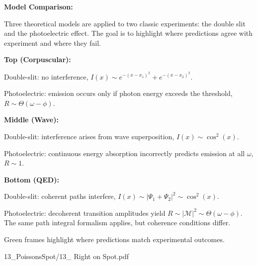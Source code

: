 \begin{SideNotePage}{
  \textbf{Model Comparison:} \par Three theoretical models are applied to two classic experiments: the double slit and the photoelectric effect. The goal is to highlight where predictions agree with experiment and where they fail.

  \vspace{1.5em}
  \textbf{Top (Corpuscular):} \par Double-slit: no interference, \( I(x) \sim e^{-(x - x_1)^2} + e^{-(x - x_2)^2} \). \par Photoelectric: emission occurs only if photon energy exceeds the threshold, \( R \sim \Theta(\omega - \phi) \).

  \vspace{1.5em}
  \textbf{Middle (Wave):} \par Double-slit: interference arises from wave superposition, \( I(x) \sim \cos^2(x) \). \par Photoelectric: continuous energy absorption incorrectly predicts emission at all \( \omega \), \( R \sim 1 \).

  \vspace{1.5em}
  \textbf{Bottom (QED):} \par Double-slit: coherent paths interfere, \( I(x) \sim |\Psi_1 + \Psi_2|^2 \sim \cos^2(x) \). \par Photoelectric: decoherent transition amplitudes yield \( R \sim |\mathcal{M}|^2 \sim \Theta(\omega - \phi) \). The same path integral formalism applies, but coherence conditions differ.

  \vspace{1.5em}
  Green frames highlight where predictions match experimental outcomes.
}{13_PoissonsSpot/13_ Right on Spot.pdf}
\end{SideNotePage}